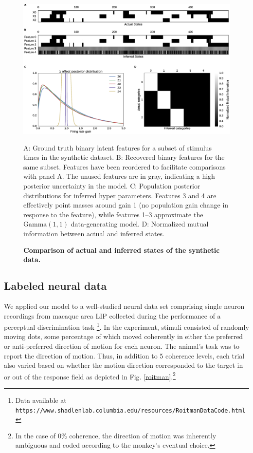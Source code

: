 \documentclass[10pt,letterpaper]{article}
\newcommand{\added}[1]{\textcolor{added}{#1}}
\begin{document}
\begin{figure}[!h]
    \includegraphics[width=\linewidth]{synthetic}
	\caption{\bf Comparison of actual and inferred states of the synthetic data.} A: \added{Ground truth binary latent features} for a subset of stimulus times in the synthetic dataset. B: Recovered binary features for the same subset. Features have been reordered to facilitate comparisons with panel A. The unused features are in gray, indicating a high posterior uncertainty in the model. C: Population posterior distributions for inferred hyper parameters. Features 3 and 4 are effectively point masses around gain 1 \added{(no population gain change in response to the feature)}, while features 1--3 approximate the $\text{Gamma}(1, 1)$ data-generating model. D: Normalized mutual information between actual and inferred states.
	\label{synthetic}
\end{figure}


\subsection*{Labeled neural data}
We applied our model to a well-studied neural data set comprising single neuron recordings from macaque area LIP collected during the performance of a perceptual discrimination task \cite{roitman2002response}\footnote{Data available at \texttt{https://www.shadlenlab.columbia.edu/resources/RoitmanDataCode.html}}. In the experiment, stimuli consisted of randomly moving dots, some percentage of which moved coherently in either the preferred or anti-preferred direction of motion for each neuron. The animal's task was to report the direction of motion. Thus, in addition to 5 coherence levels, each trial also varied based on whether the motion direction corresponded to the target in or out of the response field as depicted in Fig. \ref{roitman}.\footnote{In the case of 0\% coherence, the direction of motion was inherently ambiguous and coded according to the monkey's eventual choice.}
\end{document}
